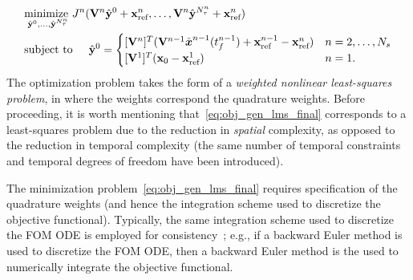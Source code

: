 \begin{equation}\label{eq:obj_gen_lms_final}
\begin{split}
& \underset{\genstateyDiscreteArg{0},\ldots,\genstateyDiscreteArg{\nstepsArg{n}}}{\text{minimize } }
\objectiveArgLMS{n} (\basisspaceArg{n} \genstateyDiscreteArg{0} + \stateInterceptArg{n},\ldots,\basisspaceArg{n} \genstateyDiscreteArg{\nstepsArg{n}} + \stateInterceptArg{n}) \\ 
& \text{subject to} \hspace{0.2 in}
\genstateyDiscreteArg{0} =
\begin{cases} \spatialIC & n = 2,\ldots,\nslabs \\
\genstateICOne& n=1. \end{cases} 
\end{split}
\end{equation}
The optimization problem takes the form of a \textit{weighted nonlinear least-squares problem}, 
in where the weights correspond the quadrature weights.  
Before proceeding, it is worth mentioning that~\eqref{eq:obj_gen_lms_final} corresponds to a least-squares problem due
to the reduction in \textit{spatial} complexity, as opposed to the reduction
in temporal complexity (the same  number of temporal constraints and temporal 
degrees of freedom have been introduced).
 
The minimization problem~\eqref{eq:obj_gen_lms_final} requires specification of the quadrature weights (and hence the integration scheme used to discretize 
the objective functional). Typically, the same integration scheme used to discretize the FOM ODE is employed for consistency~\cite{colloc_review}; e.g., if a  
backward Euler method is used to discretize the FOM ODE, then a backward Euler method is the used to numerically integrate the objective functional.

